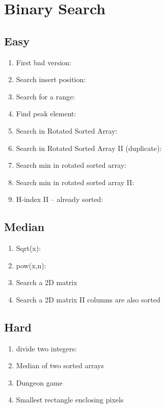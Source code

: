 \documentclass[DIV=calc, paper=a4, fontsize=11pt, twocolumn]{scrartcl}	 %
\begin{document}

\section*{Binary Search}

\subsection*{Easy}
\begin{enumerate}
\item First bad version: \cite{278} 
\item Search insert position: \cite{035}
\item Search for a range: \cite{034} 
\item {\color{red} Find peak element}: \cite{162}
\item Search in Rotated Sorted Array: \cite{033}
\item Search in Rotated Sorted Array II (duplicate): \cite{081}
\item {\color{red} Search min in rotated sorted array}: \cite{153}
\item {\color{red} Search min in rotated sorted array II}: \cite{154}
\item H-index II – already sorted: \cite{275}
\end{enumerate}

\subsection*{Median}
\begin{enumerate}
\item Sqrt(x): \cite{069}
\item pow(x,n): \cite{050} 
\item Search a 2D matrix \cite{074}
\item Search a 2D matrix II columns are also sorted \cite{240}
\end{enumerate}

\subsection*{Hard}
\begin{enumerate}
\item {\color{red} divide two integers:} \cite{029}
\item {\color{red} Median of two sorted arrays} \cite{004}
\item {\color{red} Dungeon game}
\item {\color{red} Smallest rectangle enclosing pixels}
\end{enumerate}
\end{document}
